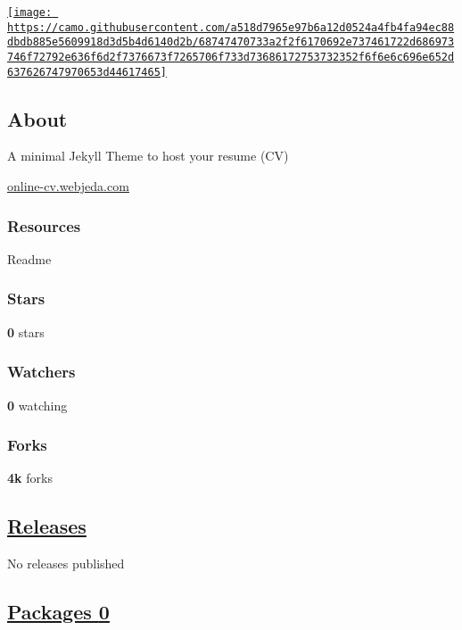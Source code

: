 \documentclass[]{article}
\begin{document}
\href{https://star-history.com/\#sharu725/online-cv\&Date}{\texttt{[image: https://camo.githubusercontent.com/a518d7965e97b6a12d0524a4fb4fa94ec88dbdb885e5609918d3d5b4d6140d2b/68747470733a2f2f6170692e737461722d686973746f72792e636f6d2f7376673f7265706f733d73686172753732352f6f6e6c696e652d637626747970653d44617465]}}

\subsection{About}\label{about}

A minimal Jekyll Theme to host your resume (CV)

{ \href{https://online-cv.webjeda.com}{online-cv.webjeda.com} }

\subsubsection{Resources}\label{resources}

Readme

\subsubsection{Stars}\label{stars}

\textbf{0} stars

\subsubsection{Watchers}\label{watchers}

\textbf{0} watching

\subsubsection{Forks}\label{forks}

\textbf{4k} forks

\subsection{\texorpdfstring{\href{/CptMike/online-cv/releases}{Releases}}{Releases}}\label{releases}

No releases published

\subsection{\texorpdfstring{\href{/users/CptMike/packages?repo_name=online-cv}{Packages
{0}}}{Packages 0}}\label{packages-0}
\end{document}
